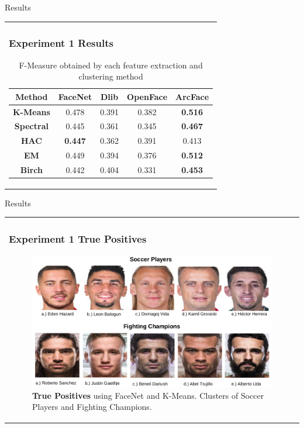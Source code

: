 \documentclass[11pt]{beamer}
\begin{document}
\begin{frame}{Results}
\begin{tabular}{l}
\parbox{1\linewidth}{
\frametitle{Experiment 1 Results}

\begin{table}[H]
\centering
\begin{tabular}{||c c c c c||}
 \hline
Method & FaceNet & Dlib & OpenFace & ArcFace\\ [0.5ex]
 \hline\hline
 \textbf{K-Means} & 0.478 & 0.391 & 0.382 & \textbf{0.516}\\ 
 \hline
  \textbf{Spectral} & 0.445 & 0.361 & 0.345 & \textbf{0.467}\\
 \hline
 \textbf{HAC} & \textbf{0.447} & 0.362 & 0.391 & 0.413\\
 \hline
 \textbf{EM} & 0.449 & 0.394 & 0.376 & \textbf{0.512}\\
 \hline
 \textbf{Birch} & 0.442 & 0.404 & 0.331 & \textbf{0.453}\\
 \hline
\end{tabular}
\caption{F-Measure obtained by each feature extraction and clustering method}
\label{table:ex1}
\end{table}

}
\end{tabular}  
\end{frame}

\begin{frame}{Results}
\begin{tabular}{l}
\parbox{1\linewidth}{
\frametitle{Experiment 1 True Positives}

\begin{figure}[H]
 \centering
    \includegraphics[width=0.9\columnwidth]{figures/soccer_tp.png}
    \caption{\textbf{True Positives} using FaceNet and K-Means. Clusters of Soccer Players and Fighting Champions.}
    \label{fig:ex1tp}
\end{figure}

}
\end{tabular}  
\end{frame}
\end{document}
